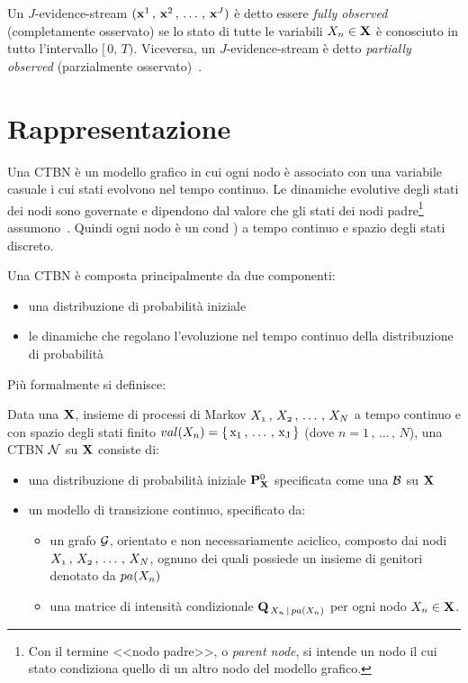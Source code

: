 Un $J$-evidence-stream $(\mathbf{x}^1\,,\,\mathbf{x}^2\,,\,\dotsc\,,\,\mathbf{x}^J)$ è detto essere \emph{fully observed} (completamente osservato) se lo stato di tutte le variabili $\mathnormal{X_n}\in\mathbf{X}$ è conosciuto in tutto l'intervallo $[\,0,\,T)$. Viceversa, un $J$-evidence-stream è detto \emph{partially observed} (parzialmente osservato)~\cite{Stella2012}.

\section{Rappresentazione}
\label{sec:ctbn-rappresentazione}
Una \acl{CTBN} è un modello grafico in cui ogni nodo è associato con una variabile casuale i cui stati evolvono nel tempo continuo. Le dinamiche evolutive degli stati dei nodi sono governate e dipendono dal valore che gli stati dei nodi padre\footnote{Con il termine <<nodo padre>>, o \emph{parent node}, si intende un nodo il cui stato condiziona quello di un altro nodo del modello grafico.} assumono~\cite{Stella2012}. Quindi ogni nodo è un \mprocess{}cond{} ) a tempo continuo e spazio degli stati discreto.

Una \acs{CTBN} è composta principalmente da due componenti:
\begin{itemize}
    \item una distribuzione di probabilità iniziale
    \item le dinamiche che regolano l'evoluzione nel tempo continuo della distribuzione di probabilità
\end{itemize}
Più formalmente si definisce:
\begin{definizione}
\label{defn:ctbn}
Data una  $\mathbf{X}$, insieme di processi di Markov $\mathnormal{X_1}\,,\,\mathnormal{X_2}\,,\,\dotsc\,,\,\mathnormal{X_N}$ a tempo continuo e con spazio degli stati finito $val(\mathnormal{X_n})=\{\,\mathrm{x_1}\,,\,\dotsc\,,\,\mathrm{x_J}\,\}$ (dove $n=1\,,\,\dotsc\,,\,N$), una \acs{CTBN} $\mathcal{N}$ su $\mathbf{X}$ consiste di:
\begin{itemize}
    \item una distribuzione di probabilità iniziale $\mathbf{P}^0_{\mathbf{X}}$ specificata come una \bn{} $\mathcal{B}$ su $\mathbf{X}$
    \item un modello di transizione continuo, specificato da:
    \begin{itemize}
        \item un grafo $\mathcal{G}$, orientato e non necessariamente aciclico, composto dai nodi $\mathnormal{X_1}\,,\,\mathnormal{X_2}\,,\,\dotsc\,,\,\mathnormal{X_N}$, ognuno dei quali possiede un insieme di genitori denotato da $pa(\mathnormal{X_n})$
        \item una matrice di intensità condizionale $\mathbf{Q}_{\,\mathnormal{X_n}\,\arrowvert\,pa(\mathnormal{X_n})}$ per ogni nodo $\mathnormal{X_n} \in \mathbf{X}$.
    \end{itemize}
\end{itemize}
\end{definizione}

